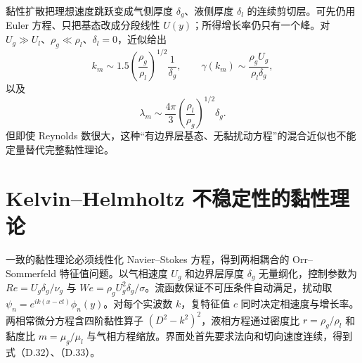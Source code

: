 \documentclass[11pt,a4paper,openany,fontset=none]{ctexbook}
\begin{document}
黏性扩散把理想速度跳跃变成气侧厚度 $\delta_g$、液侧厚度 $\delta_l$ 的连续剪切层。可先仍用 Euler 方程、只把基态改成分段线性 $U(y)$；所得增长率仍只有一个峰。对 $U_g\gg U_l$、$\rho_g\ll\rho_l$、$\delta_l=0$，近似给出
\begin{equation}
 k_m\sim1.5\left(\frac{\rho_g}{\rho_l}\right)^{1/2}\frac1{\delta_g},
 \qquad
 \gamma(k_m)\sim\frac{\rho_gU_g}{\rho_l\delta_g}, \tag{D.25}
\end{equation}
以及
\begin{equation}
 \lambda_m\sim\frac{4\pi}{3}\left(\frac{\rho_l}{\rho_g}\right)^{1/2}\delta_g. \tag{D.26}
\end{equation}
但即使 Reynolds 数很大，这种“有边界层基态、无黏扰动方程”的混合近似也不能定量替代完整黏性理论。

\section{Kelvin--Helmholtz 不稳定性的黏性理论}
一致的黏性理论必须线性化 Navier--Stokes 方程，得到两相耦合的 Orr--Sommerfeld 特征值问题。以气相速度 $U_g$ 和边界层厚度 $\delta_g$ 无量纲化，控制参数为 $Re=U_g\delta_g/\nu_g$ 与 $We=\rho_gU_g^2\delta_g/\sigma$。流函数保证不可压条件自动满足，扰动取 $\psi_n=e^{ik(x-ct)}\phi_n(y)$。对每个实波数 $k$，复特征值 $c$ 同时决定相速度与增长率。两相常微分方程含四阶黏性算子 $(D^2-k^2)^2$，液相方程通过密度比 $r=\rho_g/\rho_l$ 和黏度比 $m=\mu_g/\mu_l$ 与气相方程缩放。界面处首先要求法向和切向速度连续，得到式（D.32）、（D.33）。
\end{document}
